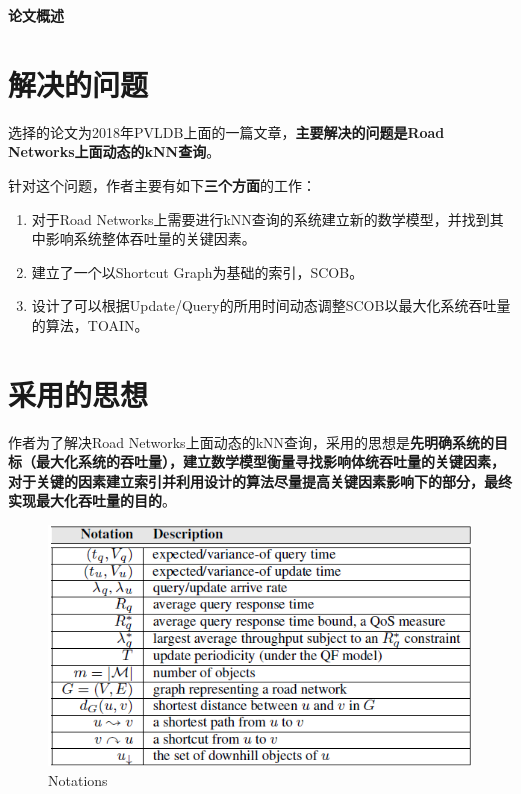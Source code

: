 \documentclass{ML}
\begin{document}
\maketitle

\tableofcontents
\newpage

\begin{center}
    \textbf{ 论文概述}
\end{center}

\section{解决的问题}
选择的论文\cite{toain}为2018年PVLDB上面的一篇文章，\textbf{主要解决的问题是Road Networks上面动态的kNN查询}。

针对这个问题，作者主要有如下\textbf{三个方面}的工作：
\begin{enumerate}
    \item 对于Road Networks上需要进行kNN查询的系统建立新的数学模型，并找到其中影响系统整体吞吐量的关键因素。
    \item 建立了一个以Shortcut Graph为基础的索引，SCOB。
    \item 设计了可以根据Update/Query的所用时间动态调整SCOB以最大化系统吞吐量的算法，TOAIN。
\end{enumerate}
\section{采用的思想}
作者为了解决Road Networks上面动态的kNN查询，采用的思想是\textbf{先明确系统的目标（最大化系统的吞吐量），建立数学模型衡量寻找影响体统吞吐量的关键因素，对于关键的因素建立索引并利用设计的算法尽量提高关键因素影响下的部分，最终实现最大化吞吐量的目的}。

\begin{figure}[htb]
	\centering
	\includegraphics[width=0.8\linewidth]{media/notations.png}
	\caption{Notations}\label{fig:notations}
\end{figure}
\end{document}
